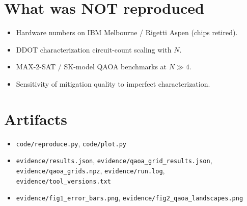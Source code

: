 \documentclass[11pt]{article}
\begin{document}
\section{What was NOT reproduced}
\begin{itemize}
  \item Hardware numbers on IBM Melbourne / Rigetti Aspen (chips retired).
  \item DDOT characterization circuit-count scaling with $N$.
  \item MAX-2-SAT / SK-model QAOA benchmarks at $N\gg 4$.
  \item Sensitivity of mitigation quality to imperfect characterization.
\end{itemize}

\section{Artifacts}
\begin{itemize}
  \item \texttt{code/reproduce.py}, \texttt{code/plot.py}
  \item \texttt{evidence/results.json}, \texttt{evidence/qaoa\_grid\_results.json},
    \texttt{evidence/qaoa\_grids.npz}, \texttt{evidence/run.log},
    \texttt{evidence/tool\_versions.txt}
  \item \texttt{evidence/fig1\_error\_bars.png},
    \texttt{evidence/fig2\_qaoa\_landscapes.png}
\end{itemize}


\end{document}
